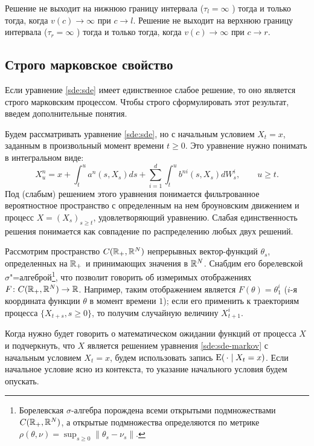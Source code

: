 \begin{theorem}[У.~Феллер]
\label{sde:t:feller}
Решение не выходит на нижнюю границу интервала ($\tau_l=\infty$ \as) тогда и только тогда, когда $v(c) \to \infty$ при $c\to l$.
Решение не выходит на верхнюю границу интервала ($\tau_r=\infty$ \as) тогда и только тогда, когда $v(c)\to \infty$ при $c\to r$.
\end{theorem}


\subsection{Строго марковское свойство}

Если уравнение \eqref{sde:sde} имеет единственное слабое решение, то оно является строго марковским процессом.
Чтобы строго сформулировать этот результат, введем дополнительные понятия.

Будем рассматривать уравнение \eqref{sde:sde}, но с начальным условием $X_{t}=x$, заданным в произвольный момент времени $t\ge 0$.
Это уравнение нужно понимать в интегральном виде:
\begin{equation}
\label{sde:sde-markov}
X_u^n = x + \int_{t}^u a^n(s,X_s)ds + \sum_{i=1}^d \int_{t}^u b^{ni}(s,X_s) dW_s^i, \qquad u\ge t.
\end{equation}
Под (слабым) решением этого уравнения понимается фильтрованное вероятностное пространство с определенным на нем броуновским движением и процесс $X=(X_s)_{s\ge t}$, удовлетворяющий уравнению.
Слабая единственность решения понимается как совпадение по распределению любых двух решений.

Рассмотрим пространство $C(\mathbb{R}_+,\mathbb{R}^N)$ непрерывных вектор-функций $\theta_s$, определенных на $\mathbb{R}_+$ и принимающих значения в $\mathbb{R}^N$.
Снабдим его борелевской $\sigma$"=алгеброй\footnote{Борелевская $\sigma$-алгебра порождена всеми открытыми подмножествами $C(\mathbb{R}_+,\mathbb{R}^N)$, а открытые подмножества определяются по метрике $\rho(\theta,\nu) = \sup_{s\ge 0} \|\theta_s-\nu_s\|$.}, что позволит говорить об измеримых отображениях $F\colon C(\mathbb{R}_+,\mathbb{R}^N) \to \mathbb{R}$.
Например, таким отображением является $F(\theta) = \theta_1^i$ ($i$-я координата функции $\theta$ в момент времени $1$); если его применить к траекториям процесса $\{X_{t+s}, s\ge 0\}$, то получим случайную величину $X_{t+1}^i$.

Когда нужно будет говорить о математическом ожидании функций от процесса $X$ и подчеркнуть, что $X$ является решением уравнения \eqref{sde:sde-markov} с начальным условием $X_t=x$, будем использовать запись $\operatorname{E}(\,\cdot\mid X_t=x)$.
Если начальное условие ясно из контекста, то указание начального условия будем опускать.

